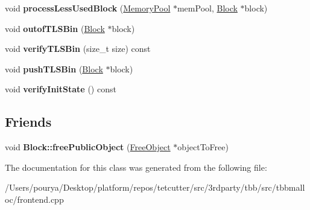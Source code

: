 \begin{DoxyCompactItemize}
\item 
\hypertarget{classrml_1_1internal_1_1Bin_a737649b83d45b1661f9c329227f1023e}{}void {\bfseries process\+Less\+Used\+Block} (\hyperlink{classrml_1_1internal_1_1MemoryPool}{Memory\+Pool} $\ast$mem\+Pool, \hyperlink{classrml_1_1internal_1_1Block}{Block} $\ast$block)\label{classrml_1_1internal_1_1Bin_a737649b83d45b1661f9c329227f1023e}

\item 
\hypertarget{classrml_1_1internal_1_1Bin_adb853b6ddddbdbaff1ce9fbdbd560f40}{}void {\bfseries outof\+T\+L\+S\+Bin} (\hyperlink{classrml_1_1internal_1_1Block}{Block} $\ast$block)\label{classrml_1_1internal_1_1Bin_adb853b6ddddbdbaff1ce9fbdbd560f40}

\item 
\hypertarget{classrml_1_1internal_1_1Bin_abd3cafddda2b7be35e60dcdb5c20878d}{}void {\bfseries verify\+T\+L\+S\+Bin} (size\+\_\+t size) const \label{classrml_1_1internal_1_1Bin_abd3cafddda2b7be35e60dcdb5c20878d}

\item 
\hypertarget{classrml_1_1internal_1_1Bin_a88e5bf9d3eb59a30e58f3dc23e240d4e}{}void {\bfseries push\+T\+L\+S\+Bin} (\hyperlink{classrml_1_1internal_1_1Block}{Block} $\ast$block)\label{classrml_1_1internal_1_1Bin_a88e5bf9d3eb59a30e58f3dc23e240d4e}

\item 
\hypertarget{classrml_1_1internal_1_1Bin_ab330da980f68075f42af48e873ba46b4}{}void {\bfseries verify\+Init\+State} () const \label{classrml_1_1internal_1_1Bin_ab330da980f68075f42af48e873ba46b4}

\end{DoxyCompactItemize}
\subsection*{Friends}
\begin{DoxyCompactItemize}
\item 
\hypertarget{classrml_1_1internal_1_1Bin_aa63068e14e2a856f99ff1298b19d32c3}{}void {\bfseries Block\+::free\+Public\+Object} (\hyperlink{structrml_1_1internal_1_1FreeObject}{Free\+Object} $\ast$object\+To\+Free)\label{classrml_1_1internal_1_1Bin_aa63068e14e2a856f99ff1298b19d32c3}

\end{DoxyCompactItemize}


The documentation for this class was generated from the following file\+:\begin{DoxyCompactItemize}
\item 
/\+Users/pourya/\+Desktop/platform/repos/tetcutter/src/3rdparty/tbb/src/tbbmalloc/frontend.\+cpp\end{DoxyCompactItemize}
